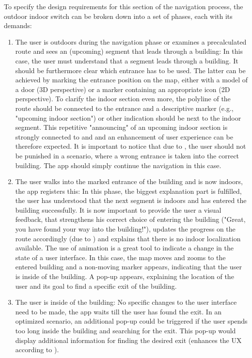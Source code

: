 To specify the design requirements for this section of the navigation process, the outdoor indoor switch can be broken down into a set of phases, each with its demands:


\begin{enumerate}
    \item The user is outdoors during the navigation phase or examines a precalculated route and sees an (upcoming) segment that leads through a building: In this case, the user must understand that a segment leads through a building. It should be furthermore clear which entrance has to be used. The latter can be achieved by marking the entrance position on the map, either with a model of a door (3D perspective) \cite{jakobs_law} or a marker containing an appropriate icon (2D perspective). To clarify the indoor section even more, the polyline of the route should be connected to the entrance and a descriptive marker (e.g., "upcoming indoor section") or other indication should be next to the indoor segment. This repetitive "announcing" of an upcoming indoor section is strongly connected to \cite{teslers_law} and \cite{law_of_proximity} and an enhancement of user experience can be therefore expected. It is important to notice that due to \cite{postels_law}, the user should not be punished in a scenario, where a wrong entrance is taken into the correct building. The app should simply continue the navigation in this case.
    \item The user walks into the marked entrance of the building and is now indoors, the app registers this: In this phase, the biggest explanation part is fulfilled, the user has understood that the next segment is indoors and has entered the building successfully. It is now important to provide the user a visual feedback, that strengthens his correct choice of entering the building ("Great, you have found your way into the building!"), updates the progress on the route accordingly (due to \cite{goal_gradient_effect}) and explains that there is no indoor localization available. The use of animation is a great tool to indicate a change in the state of a user interface. In this case, the map moves and zooms to the entered building and a non-moving marker appears, indicating that the user is inside of the building. A pop-up appears, explaining the location of the user and its goal to find a specific exit of the building.
    \item The user is inside of the building: No specific changes to the user interface need to be made, the app waits till the user has found the exit. In an optimized scenario, an additional pop-up could be triggered if the user spends too long inside the building and searching for the exit. This pop-up would display additional information for finding the desired exit (enhances the UX according to \cite{teslers_law}).

\end{enumerate}
